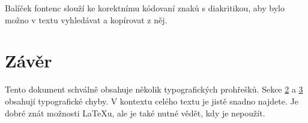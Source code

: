 \documentclass[hidelinks,10pt,a4paper,twocolumn]{article}
\begin{document}
	Balíček \selectfont fontenc \selectfont slouží ke korektnímu kódovaní znaků s diakritikou, aby bylo možno v textu vyhledávat a kopírovat z něj.
	
	\section{Závěr}
	
	Tento dokument schválně obsahuje několik typografických prohřešků. Sekce \hyperref[sec:smisena]{2} a \hyperref[sec:dalsirady]{3} obsahují typografické chyby. V kontextu celého textu je jistě snadno najdete. Je dobré znát možnosti \LaTeX u, ale je také nutné vědět, kdy je nepoužít.
	

	
\end{document}
